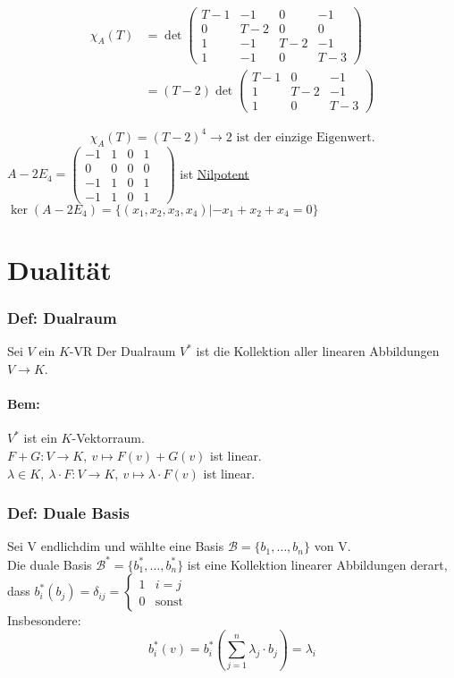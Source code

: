 \documentclass[titlepage,12pt,a4paper,ngerman]{report}
\newcommand{\tx}[1]{\textrm{#1}}
\newcommand{\casess}[4]{\left\{ \begin{array}{ll} {#1} & {#2} \\ {#3} & {#4} \end{array} \right.}
\begin{document}
\begin{align*} \chi_A(T) &= \det\begin{pmatrix}
T-1 & -1 & 0 & -1\\ 0 & T-2 & 0 & 0 \\ 1 & -1 & T-2 & -1 \\ 1 & -1 & 0 & T-3
\end{pmatrix}\\[8pt]
&= (T-2) \det \begin{pmatrix}
T-1 & 0 & -1 \\ 1 & T-2 & -1 \\ 1 & 0 & T-3
\end{pmatrix}\end{align*}

$$\chi_A (T) = (T-2)^4 \rightarrow 2 \tx{ ist der einzige Eigenwert.}$$
$A-2 E_4 = \begin{pmatrix}
-1&1&0&1\\0&0&0&0&\\-1&1&0&1\\-1&1&0&1
\end{pmatrix}$ ist \underline{\underline{Nilpotent}}\\
$ \ker(A - 2 E_4) = \{(x_1,x_2,x_3,x_4) | -x_1 +x_2 + x_4 = 0\} $


\chapter{Dualität}

\subsection{Def: Dualraum}
Sei $V$ ein $K$-VR Der Dualraum $V^*$ ist die Kollektion aller linearen Abbildungen $V \to K$.
\subsubsection{Bem:} $V^*$ ist ein $K$-Vektorraum.\\
$F + G: V\to K, \ v\mapsto F(v) + G(v)$ ist linear.\\
$\lambda \in K, \ \lambda \cdot F : V \to K, \ v \mapsto \lambda \cdot F(v)$ ist linear.

\subsection{Def: Duale Basis}
Sei V endlichdim und wählte eine Basis $ \mathcal{B} = \{ b_1,\dots,b_n\} $ von  V.\\
Die duale Basis $ \mathcal{B}^* = \{b_1^*,\dots,b_n^*\} $ ist eine Kollektion linearer Abbildungen derart, dass $ b^*_i (b_j) = \delta_{ij} = \casess{1}{i=j}{0}{\tx{sonst}} $\\
Insbesondere:
$$b^*_i(v) = b_i^* (\sum_{j=1}^{n} \lambda_j \cdot b_j) = \lambda_i$$
\end{document}
